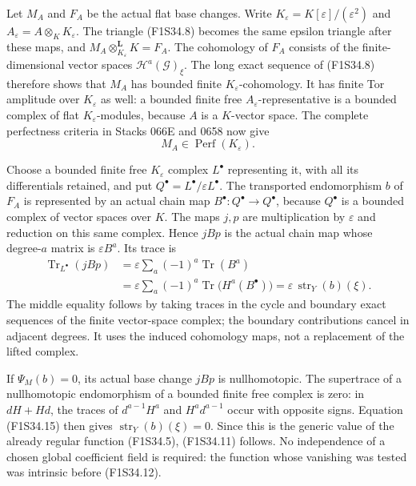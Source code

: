 Let $M_A$ and $F_A$ be the actual flat base
changes. Write $K_\varepsilon=K[\varepsilon]/
(\varepsilon^2)$ and $A_\varepsilon=A\otimes_K
K_\varepsilon$.
The triangle (F1S34.8) becomes the same epsilon
triangle after these maps, and
$M_A\otimes^{\mathbf L}_{K_\varepsilon}K=F_A$.
The cohomology of $F_A$ consists of the
finite-dimensional vector spaces
$\mathcal H^a(\mathcal G)_\xi$.
The long exact sequence of (F1S34.8) therefore
shows that $M_A$ has bounded finite
$K_\varepsilon$-cohomology.
It has finite Tor amplitude over
$K_\varepsilon$ as well: a bounded finite free
$A_\varepsilon$-representative is a bounded
complex of flat $K_\varepsilon$-modules,
because $A$ is a $K$-vector space.
The complete perfectness criteria in Stacks
066E and 0658 now give
\[
              M_A\in\operatorname{Perf}(K_\varepsilon).
 \tag{F1S34.14}
\]

Choose a bounded finite free $K_\varepsilon$
complex $L^\bullet$ representing it, with all
its differentials retained, and put
$Q^\bullet=L^\bullet/\varepsilon L^\bullet$.
The transported endomorphism $b$ of $F_A$
is represented by an actual chain map
$B^\bullet:Q^\bullet\to Q^\bullet$, because
$Q^\bullet$ is a bounded complex of vector
spaces over $K$.
The maps $j,p$ are multiplication by
$\varepsilon$ and reduction on this same
complex. Hence $jBp$ is the actual chain map
whose degree-$a$ matrix is $\varepsilon B^a$.
Its trace is
\[
\begin{split}
 \operatorname{Tr}_{L^\bullet}(jBp)
       &=\varepsilon\sum_a(-1)^a\operatorname{Tr}(B^a)\\
       &=\varepsilon\sum_a(-1)^a
                      \operatorname{Tr}\bigl(H^a(B^\bullet)\bigr)
        =\varepsilon\,\operatorname{str}_Y(b)(\xi).
\end{split}
 \tag{F1S34.15}
\]
The middle equality follows by taking traces
in the cycle and boundary exact sequences
of the finite vector-space complex; the
boundary contributions cancel in adjacent
degrees. It uses the induced cohomology maps,
not a replacement of the lifted complex.

If $\Psi_M(b)=0$, its actual base change
$jBp$ is nullhomotopic.
The supertrace of a nullhomotopic endomorphism
of a bounded finite free complex is zero:
in $dH+Hd$, the traces of $d^{a-1}H^a$
and $H^a d^{a-1}$ occur with opposite signs.
Equation (F1S34.15) then gives
$\operatorname{str}_Y(b)(\xi)=0$.
Since this is the generic value of the
already regular function (F1S34.5),
(F1S34.11) follows.
No independence of a chosen global coefficient
field is required: the function whose vanishing
was tested was intrinsic before (F1S34.12).

